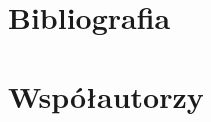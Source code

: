 \documentclass[]{coda-art}
\begin{document}

\clearpage{}

\section{Bibliografia}
\label{bibliografia}





\clearpage\section{Współautorzy}
\label{wspolautorzy}


\end{document}
